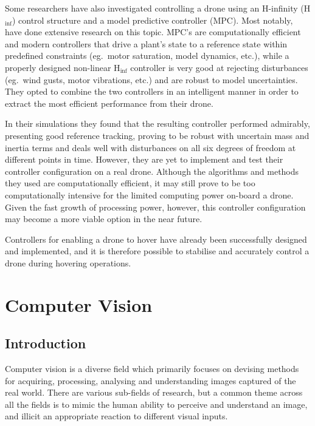 Some researchers have also investigated controlling a drone using an H-infinity (H$_{\inf}$) control structure and a model predictive controller (MPC). Most notably,~\cite{raffo2010integral} have done extensive research on this topic. MPC's are computationally efficient and modern controllers that drive a plant's state to a reference state within predefined constraints (eg.\ motor saturation, model dynamics, etc.), while a properly designed non-linear H$_{\inf}$ controller is very good at rejecting disturbances (eg.\ wind gusts, motor vibrations, etc.) and are robust to model uncertainties. They opted to combine the two controllers in an intelligent manner in order to extract the most efficient performance from their drone. 

In their simulations they found that the resulting controller performed admirably, presenting good reference tracking, proving to be robust with uncertain mass and inertia terms and deals well with disturbances on all six degrees of freedom at different points in time. However, they are yet to implement and test their controller configuration on a real drone. Although the algorithms and methods they used are computationally efficient, it may still prove to be too computationally intensive for the limited computing power on-board a drone. Given the fast growth of processing power, however, this controller configuration may become a more viable option in the near future. 

Controllers for enabling a drone to hover have already been successfully designed and implemented, and it is therefore possible to stabilise and accurately control a drone during hovering operations. 

\section{Computer Vision}

\subsection{Introduction}

Computer vision is a diverse field which primarily focuses on devising methods for acquiring, processing, analysing and understanding images captured of the real world. There are various sub-fields of research, but a common theme across all the fields is to mimic the human ability to perceive and understand an image, and illicit an appropriate reaction to different visual inputs. 


